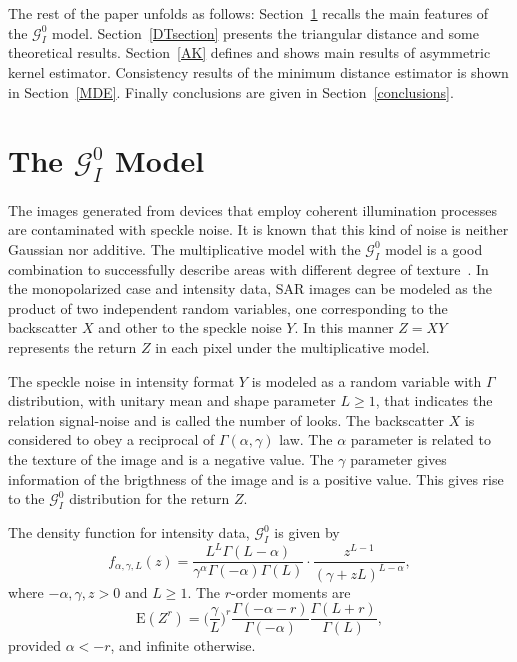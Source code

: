 \documentclass[journal]{IEEEtran}
\numberwithin{equation}{section}
\begin{document}
The rest of the paper unfolds as follows: 
Section~\ref{sec_SAR} recalls the main features of the $\mathcal{G}_I^0$ model.
Section~\ref{DTsection} presents the triangular distance and some theoretical results. 
Section~\ref{AK} defines and shows main results of asymmetric kernel estimator.
Consistency results of the minimum distance estimator is shown in Section~\ref{MDE}. Finally conclusions are given in Section~\ref{conclusions}.

\section{The $\mathcal{G}_I^0$ Model}
\label{sec_SAR}
The images generated from devices that employ coherent illumination processes are contaminated with speckle noise. It is known that this kind of noise is neither Gaussian nor additive. The multiplicative model with the $\mathcal{G}_I^{0}$ model is a good combination to successfully describe areas with different degree of texture~\cite{Frery97,MejailJacoboFreryBustos:IJRS}. In the monopolarized case and intensity data, SAR images can be modeled as the product of two independent random variables, one corresponding to the backscatter $X$ and other to the speckle noise $Y$. In this manner $Z=X Y  $ represents the return $Z$ in each pixel under the multiplicative model.

The speckle noise in intensity format $Y$ is modeled as a random variable with $\Gamma $ distribution, with unitary mean and shape parameter $L\geq1$, that indicates the relation signal-noise and is called the number of looks. The backscatter $X$ is considered to obey a reciprocal of $\Gamma(\alpha,\gamma) $ law. The $\alpha$ parameter is related to the texture of the image and is a negative value. The $\gamma$ parameter gives information of the brigthness of the image and is a positive value. This gives rise to the $\mathcal{G}_I^{0}$ distribution for the return $Z$.

The density function for intensity data, $\mathcal{G}_I^{0}$ is given by
\begin{equation}
f_{\alpha,\gamma,L}( z) =\frac{L^{L}\Gamma ( L-\alpha
	) }{\gamma ^{\alpha }\Gamma ( -\alpha ) \Gamma (
	L) }\cdot  
\frac{z^{L-1}}{( \gamma +zL) ^{L-\alpha }},%
\label{ec_dens_gI0}
\end{equation}
where $-\alpha,\gamma ,z>0$ and $L\geq 1$. 
The $r$-order moments are
\begin{equation}
\text{E}(Z^r) =\Big(\frac{\gamma}{L}\Big)^r\frac{\Gamma ( -\alpha-r )}{ \Gamma (-\alpha) }
\frac{\Gamma (L+r )}{\Gamma (L)},
\label{moments_gI0}
\end{equation}
provided $\alpha<-r$, and infinite otherwise.
\end{document}
